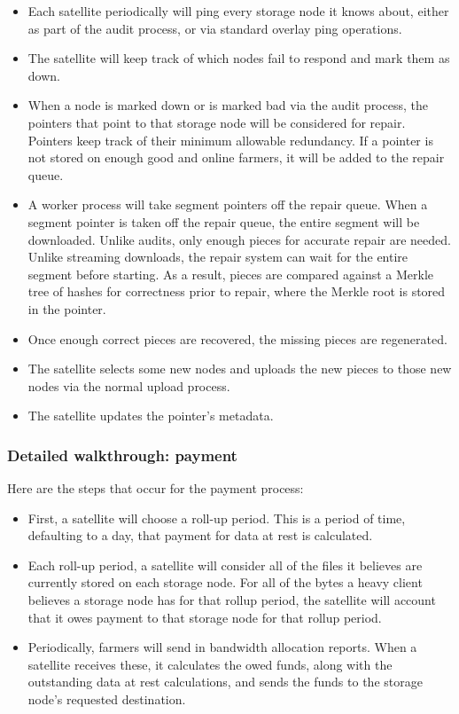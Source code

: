 \documentclass[a4paper,10pt]{article} \usepackage[utf8]{inputenc}
\begin{document}
\begin{itemize}
\item Each satellite periodically will ping every storage node it knows 
about,
  either as part of the audit process, or via standard overlay ping operations.
\item The satellite will keep track of which nodes fail to respond and mark
  them as down.
\item When a node is marked down or is marked bad via the audit process, the
  pointers that point to that storage node will be considered for repair. 
  Pointers
  keep track of their minimum allowable redundancy. If a pointer is not stored
  on enough good and online farmers, it will be added to the repair queue.
\item A worker process will take segment pointers off the repair queue. When
  a segment pointer is taken off the repair queue, the entire segment will be
  downloaded. Unlike audits, only enough pieces for accurate repair are needed.
  Unlike streaming downloads, the repair system can wait for the entire segment
  before starting. As a result, pieces are compared against a Merkle tree of
  hashes for correctness prior to repair, where the Merkle root is stored in
  the pointer.
\item Once enough correct pieces are recovered, the missing pieces are
  regenerated.
\item The satellite selects some new nodes and uploads the new pieces to
  those new nodes via the normal upload process.
\item The satellite updates the pointer's metadata.
\end{itemize}

\subsubsection{Detailed walkthrough: payment}

Here are the steps that occur for the payment process: 

\begin{itemize}
\item First, a satellite will choose a roll-up period. This is a period of
  time, defaulting to a day, that payment for data at rest is calculated.
\item Each roll-up period, a satellite will consider all of the files it
  believes are currently stored on each storage node. For all of the bytes a 
  heavy
  client believes a storage node has for that rollup period, the satellite 
  will
  account that it owes payment to that storage node for that rollup period.
\item Periodically, farmers will send in bandwidth allocation reports. When a
  satellite receives these, it calculates the owed funds, along with the
  outstanding data at rest calculations, and sends the funds to the storage 
  node's
  requested destination.
\end{itemize}
\end{document}
